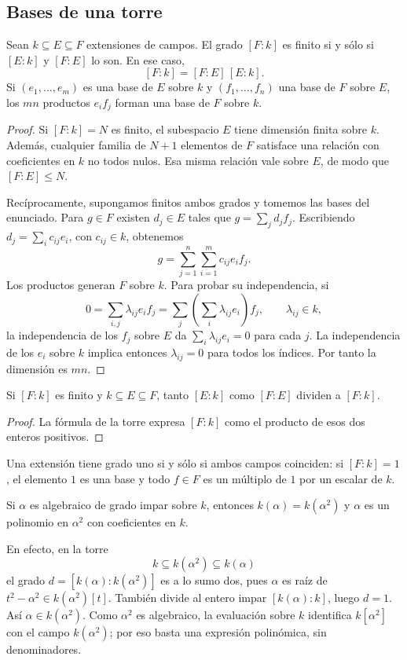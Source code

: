 \subsection{Bases de una torre}
\begin{prop}\label{prop:C23-torre}
Sean $k\subseteq E\subseteq F$ extensiones de campos. El grado $[F:k]$ es finito si y sólo si $[E:k]$ y $[F:E]$ lo son. En ese caso,
\[
[F:k]=[F:E]\,[E:k].
\]
Si $(e_1,\ldots,e_m)$ es una base de $E$ sobre $k$ y $(f_1,\ldots,f_n)$ una base de $F$ sobre $E$, los $mn$ productos $e_if_j$ forman una base de $F$ sobre $k$.
\end{prop}
\begin{proof}
Si $[F:k]=N$ es finito, el subespacio $E$ tiene dimensión finita sobre $k$. Además, cualquier familia de $N+1$ elementos de $F$ satisface una relación con coeficientes en $k$ no todos nulos. Esa misma relación vale sobre $E$, de modo que $[F:E]\leq N$.

Recíprocamente, supongamos finitos ambos grados y tomemos las bases del enunciado. Para $g\in F$ existen $d_j\in E$ tales que $g=\sum_jd_jf_j$. Escribiendo $d_j=\sum_ic_{ij}e_i$, con $c_{ij}\in k$, obtenemos
\[
g=\sum_{j=1}^n\sum_{i=1}^m c_{ij}e_if_j.
\]
Los productos generan $F$ sobre $k$. Para probar su independencia, si
\[
0=\sum_{i,j}\lambda_{ij}e_if_j
=\sum_j\left(\sum_i\lambda_{ij}e_i\right)f_j,
\qquad \lambda_{ij}\in k,
\]
la independencia de los $f_j$ sobre $E$ da $\sum_i\lambda_{ij}e_i=0$ para cada $j$. La independencia de los $e_i$ sobre $k$ implica entonces $\lambda_{ij}=0$ para todos los índices. Por tanto la dimensión es $mn$.
\end{proof}

\begin{coro}\label{coro:C23-divisibilidad}
Si $[F:k]$ es finito y $k\subseteq E\subseteq F$, tanto $[E:k]$ como $[F:E]$ dividen a $[F:k]$.
\end{coro}
\begin{proof}
La fórmula de la torre expresa $[F:k]$ como el producto de esos dos enteros positivos.
\end{proof}
Una extensión tiene grado uno si y sólo si ambos campos coinciden: si $[F:k]=1$, el elemento $1$ es una base y todo $f\in F$ es un múltiplo de $1$ por un escalar de $k$.

\begin{ejem}
Si $\alpha$ es algebraico de grado impar sobre $k$, entonces $k(\alpha)=k(\alpha^2)$ y $\alpha$ es un polinomio en $\alpha^2$ con coeficientes en $k$.

En efecto, en la torre
\[
k\subseteq k(\alpha^2)\subseteq k(\alpha)
\]
el grado $d=[k(\alpha):k(\alpha^2)]$ es a lo sumo dos, pues $\alpha$ es raíz de $t^2-\alpha^2\in k(\alpha^2)[t]$. También divide al entero impar $[k(\alpha):k]$, luego $d=1$. Así $\alpha\in k(\alpha^2)$. Como $\alpha^2$ es algebraico, la evaluación sobre $k$ identifica $k[\alpha^2]$ con el campo $k(\alpha^2)$; por eso basta una expresión polinómica, sin denominadores.
\end{ejem}

